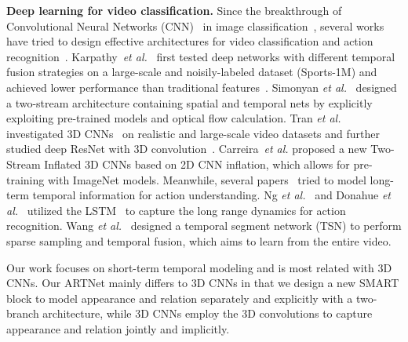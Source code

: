 \documentclass[10pt,twocolumn,letterpaper]{article}
\begin{document}
{\bf Deep learning for video classification.} Since the breakthrough of Convolutional Neural Networks (CNN)~\cite{lecun-98} in image classification~\cite{KrizhevskySH12}, several works have tried to design effective architectures for video classification and action recognition~\cite{KarpathyTSLSF14,SimonyanZ14,TranBFTP15,WangXWQLTV16,NgHVVMT15,DonahueHGRVDS15,CarreiraZ17,QiuYM17,SunJYS15}. Karpathy~\emph{et al.}~\cite{KarpathyTSLSF14} first tested deep networks with different temporal fusion strategies on a large-scale and noisily-labeled dataset (Sports-1M) and achieved lower performance than traditional features~\cite{WangS13a}. Simonyan \emph{et al.}~\cite{SimonyanZ14} designed a two-stream architecture containing spatial and temporal nets by explicitly exploiting pre-trained models and optical flow calculation. Tran \emph{et al.}~\cite{TranBFTP15} investigated 3D CNNs~\cite{JiXYY13} on realistic and large-scale video datasets and further studied deep ResNet with 3D convolution~\cite{Tran17}. Carreira~\emph{et al.} proposed a new Two-Stream Inflated 3D CNNs based on 2D CNN inflation, which allows for pre-training with ImageNet models. Meanwhile, several papers~\cite{NgHVVMT15,DonahueHGRVDS15,WangXWQLTV16} tried to model long-term temporal information for action understanding. Ng \emph{et al.}~\cite{NgHVVMT15} and Donahue \emph{et al.}~\cite{DonahueHGRVDS15} utilized the LSTM~\cite{HochreiterS97} to capture the long range dynamics for action recognition. Wang \emph{et al.}~\cite{WangXWQLTV16} designed a  temporal segment network (TSN) to perform sparse sampling and temporal fusion, which aims to learn from the entire video. 

Our work focuses on short-term temporal modeling and is most related with 3D CNNs. Our ARTNet mainly differs to 3D CNNs in that we design a new SMART block to model appearance and relation separately and explicitly with a two-branch architecture, while 3D CNNs employ the 3D convolutions to capture appearance and relation jointly and implicitly.
\end{document}
